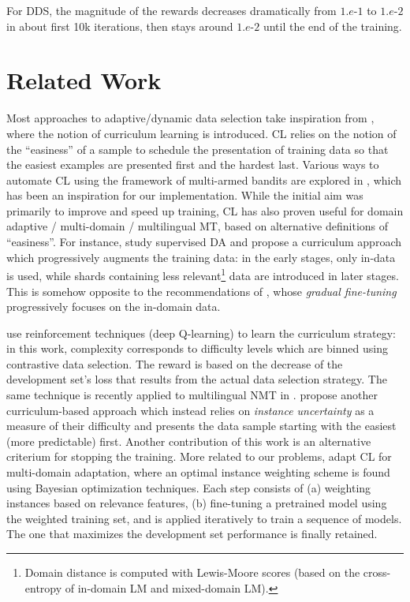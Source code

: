 For DDS, the magnitude of the rewards decreases dramatically from $1.e\text{-}1$ to $1.e\text{-}2$ in about first 10k iterations, then stays around $1.e\text{-}2$ until the end of the training.


\section{Related Work \label{sec:related-chap7}}

Most approaches to adaptive/dynamic data selection take inspiration from \citet{Bengio09curriculum}, where the notion of curriculum learning is introduced. CL relies on the notion of the ``easiness'' of a sample to schedule the presentation of training data so that the easiest examples are presented first and the hardest last. Various ways to automate CL using the framework of multi-armed bandits are explored in \citep{Graves17automated}, which has been an inspiration for our implementation. While the initial aim was primarily to improve and speed up training, CL has also proven useful for domain adaptive / multi-domain / multilingual MT, based on alternative definitions of ``easiness''.
For instance, \citet{Zhang19curriculum} study supervised DA and propose a curriculum approach which progressively augments the training data: in the early stages, only in-data is used, while shards containing less relevant\footnote{Domain distance is computed with Lewis-Moore scores (based on the cross-entropy of in-domain LM and mixed-domain LM).} data are introduced in later stages. This is somehow opposite to the recommendations of \citet{Wees17dynamic}, whose \emph{gradual fine-tuning} progressively focuses on the in-domain data.

\citet{Kumar19reinforcement} use reinforcement techniques (deep Q-learning) to learn the curriculum strategy: in this work, complexity corresponds to difficulty levels which are binned using contrastive data selection. The reward is based on the decrease of the development set's loss that results from the actual data selection strategy. The same technique is recently applied to multilingual NMT in \citep{Kumar21learning}. \citet{Zhou20uncertainty} propose another curriculum-based approach which instead relies on \emph{instance uncertainty} as a measure of their difficulty and presents the data sample starting with the easiest (more predictable) first. Another contribution of this work is an alternative criterium for stopping the training. More related to our problems, \citet{Wang20learning-multi} adapt CL for multi-domain adaptation, where an optimal instance weighting scheme is found using Bayesian optimization techniques. Each step consists of (a) weighting instances based on relevance features, (b) fine-tuning a pretrained model using the weighted training set, and is applied iteratively to train a sequence of models. The one that maximizes the development set performance is finally retained.

